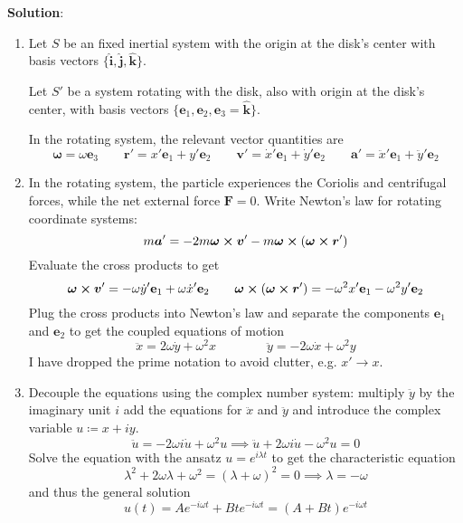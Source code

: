 \documentclass[11pt, a4paper]{article}
\newcommand{\e}{\mathbf{e}} %
\newcommand{\uvec}[1]{\bm{\hat{\mathbf{#1}}}} %
\begin{document}
\vspace{3mm}
\textbf{Solution}: 
\begin{enumerate}
	\item Let $ S $ be an fixed inertial system with the origin at the disk's center with basis vectors $ \{\uvec{i}, \uvec{j}, \uvec{k} \} $.
	
	Let $ S' $ be a system rotating with the disk, also with origin at the disk's center, with basis vectors $ \{\e_1, \e_2, \e_3 = \uvec{k} \} $. 
	
	In the rotating system, the relevant vector quantities are
	\begin{equation*}
		\bm{\omega} = \omega \e_3 \qquad \bm{r}' = x' \e_1 + y' \e_2 \qquad \bm{v}' = \dot{x}' \e_1 + \dot{y}' \e_2 \qquad \bm{a}' = \ddot{x}' \e_1 + \ddot{y}' \e_2
	\end{equation*}
	
	\item In the rotating system, the particle experiences the Coriolis and centrifugal forces, while the net external force $ \bm{F} = 0$. Write Newton's law for rotating coordinate systems:
	\begin{equation*}
		m \bm{a}' = - 2 m \bm{\omega} \cross \bm{v}' - m \bm{\omega} \cross (\bm{\omega} \cross \bm{r}')
	\end{equation*}
	Evaluate the cross products to get
	\begin{equation*}
		\bm{\omega} \cross \bm{v}' = - \omega \dot{y}' \e_1 + \omega \dot{x}' \e_2 \qquad \bm{\omega} \cross (\bm{\omega} \cross \bm{r}') = -\omega^2 x' \e_1 - \omega^2 y' \e_2
	\end{equation*}
	Plug the cross products into Newton's law and separate the components $ \e_1 $ and $ \e_2 $ to get the coupled equations of motion
	\begin{equation*}
		\ddot x = 2 \omega \dot y + \omega^2 x \qquad \qquad \ddot y = - 2 \omega \dot x + \omega^2 y
	\end{equation*}
	I have dropped the prime notation to avoid clutter, e.g. $ x' \to x $.
	
	\item Decouple the equations using the complex number system: multiply $ \ddot{y} $ by the imaginary unit $ i $ add the equations for $ \ddot{x} $ and $ \ddot{y} $ and introduce the complex variable $ u \coloneqq x + iy $.
	\begin{equation*}
		\ddot{u} = -2 \omega i \dot{u} + \omega^2 u \implies \ddot{u} + 2 \omega i \dot{u} - \omega^2 u = 0
	\end{equation*}
	Solve the equation with the ansatz $ u = e^{i\lambda t} $ to get the characteristic equation 
	\begin{equation*}
		\lambda^2 + 2 \omega \lambda + \omega^2 = (\lambda + \omega)^2 = 0 \implies \lambda = - \omega
	\end{equation*}
	and thus the general solution
	\begin{equation*}
		u(t) = A e^{-i\omega t} + Bte^{-i\omega t} = (A + Bt)e^{-i\omega t}
	\end{equation*}
	

\end{enumerate}
\end{document}
